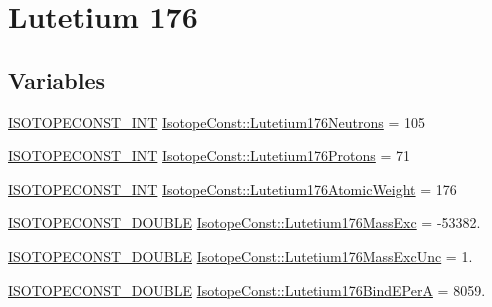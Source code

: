\hypertarget{group___isotope_const-_lutetium-_lu176}{}\section{Lutetium 176}
\label{group___isotope_const-_lutetium-_lu176}
\subsection*{Variables}
\begin{DoxyCompactItemize}
\item 
\mbox{\hyperlink{group___isotope_const-_macros_ga5f18360b3e99483a35c32d789e62621c}{I\+S\+O\+T\+O\+P\+E\+C\+O\+N\+S\+T\+\_\+\+I\+NT}} \mbox{\hyperlink{group___isotope_const-_lutetium-_lu176_ga486402a5ecc2c23c388d7120143b9d74}{Isotope\+Const\+::\+Lutetium176\+Neutrons}} = 105
\item 
\mbox{\hyperlink{group___isotope_const-_macros_ga5f18360b3e99483a35c32d789e62621c}{I\+S\+O\+T\+O\+P\+E\+C\+O\+N\+S\+T\+\_\+\+I\+NT}} \mbox{\hyperlink{group___isotope_const-_lutetium-_lu176_ga16c9b5e57dd9b9e4b49b7e50fdb9af0a}{Isotope\+Const\+::\+Lutetium176\+Protons}} = 71
\item 
\mbox{\hyperlink{group___isotope_const-_macros_ga5f18360b3e99483a35c32d789e62621c}{I\+S\+O\+T\+O\+P\+E\+C\+O\+N\+S\+T\+\_\+\+I\+NT}} \mbox{\hyperlink{group___isotope_const-_lutetium-_lu176_gad3d9c30056b6e7d6b6882b0d7656cd86}{Isotope\+Const\+::\+Lutetium176\+Atomic\+Weight}} = 176
\item 
\mbox{\hyperlink{group___isotope_const-_macros_ga8f45a7272ce02c0b4c65c44636ed719a}{I\+S\+O\+T\+O\+P\+E\+C\+O\+N\+S\+T\+\_\+\+D\+O\+U\+B\+LE}} \mbox{\hyperlink{group___isotope_const-_lutetium-_lu176_ga3ec1d5b665255b57d3e3f1377837db5c}{Isotope\+Const\+::\+Lutetium176\+Mass\+Exc}} = -\/53382.
\item 
\mbox{\hyperlink{group___isotope_const-_macros_ga8f45a7272ce02c0b4c65c44636ed719a}{I\+S\+O\+T\+O\+P\+E\+C\+O\+N\+S\+T\+\_\+\+D\+O\+U\+B\+LE}} \mbox{\hyperlink{group___isotope_const-_lutetium-_lu176_gab3b149d6d16a2cf6c641473b61617bd2}{Isotope\+Const\+::\+Lutetium176\+Mass\+Exc\+Unc}} = 1.
\item 
\mbox{\hyperlink{group___isotope_const-_macros_ga8f45a7272ce02c0b4c65c44636ed719a}{I\+S\+O\+T\+O\+P\+E\+C\+O\+N\+S\+T\+\_\+\+D\+O\+U\+B\+LE}} \mbox{\hyperlink{group___isotope_const-_lutetium-_lu176_ga9ee514b2a7e62b9c66effdbafb73facb}{Isotope\+Const\+::\+Lutetium176\+Bind\+E\+PerA}} = 8059.
\item 

\end{DoxyCompactItemize}
